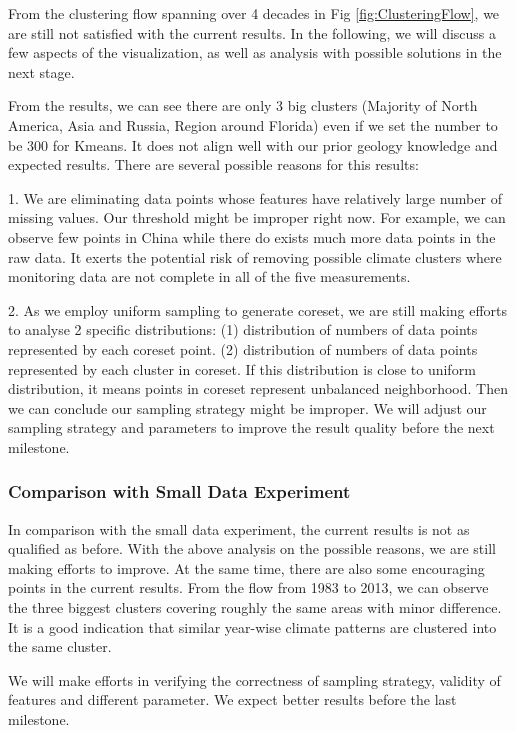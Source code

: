 From the clustering flow spanning over 4 decades in Fig \ref{fig:ClusteringFlow}, we are still not satisfied with the current results. In the following, we will discuss a few aspects of the visualization, as well as analysis with possible solutions in the next stage.

From the results, we can see there are only 3 big clusters (Majority of North America, Asia and Russia, Region around Florida) even if we set the number to be 300 for Kmeans. It does not align well with our prior geology knowledge and expected results. There are several possible reasons for this results:

1. We are eliminating data points whose features have relatively large number of missing values. Our threshold might be improper right now. For example, we can observe few points in China while there do exists much more data points in the raw data. It exerts the potential risk of removing possible climate clusters where monitoring data are not complete in all of the five measurements.

2. As we employ uniform sampling to generate coreset, we are still making efforts to analyse 2 specific distributions: (1) distribution of  numbers of data points represented by each coreset point. (2) distribution of numbers of data points represented by each cluster in coreset. If this distribution is close to uniform distribution, it means points in coreset represent unbalanced neighborhood. Then we can conclude our sampling strategy might be improper. We will adjust our sampling strategy and parameters to improve the result quality before the next milestone.

\subsubsection{Comparison with Small Data Experiment}
In comparison with the small data experiment, the current results is not as qualified as before. With the above analysis on the possible reasons, we are still making efforts to improve. At the same time, there are also some encouraging points in the current results. From the flow from 1983 to 2013, we can observe the three biggest clusters covering roughly the same areas with minor difference. It is a good indication that similar year-wise climate patterns are clustered into the same cluster.

We will make efforts in verifying the correctness of sampling strategy, validity of features and different parameter. We expect better results before the last milestone.

